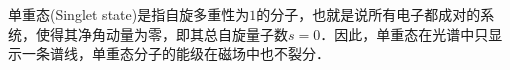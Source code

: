 
单重态(Singlet state)是指自旋多重性为$1$的分子，也就是说所有电子都成对的系统，使得其净角动量为零，即其总自旋量子数$s=0$．因此，单重态在光谱中只显示一条谱线，单重态分子的能级在磁场中也不裂分．